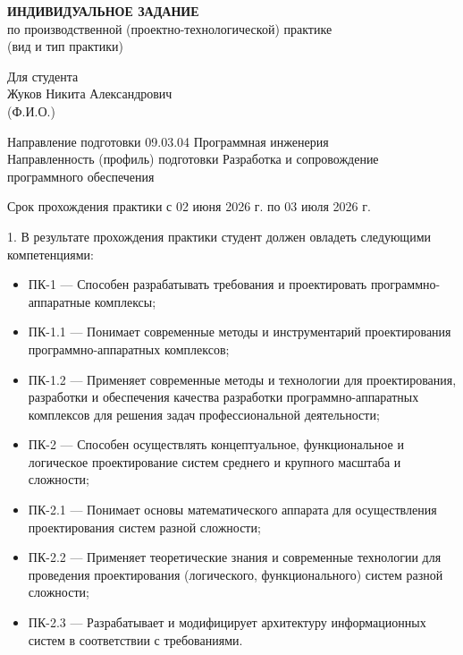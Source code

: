 \documentclass[12pt,a4paper]{report}
\begin{document}
\newpage
\thispagestyle{empty}

\begin{center}
\textbf{ИНДИВИДУАЛЬНОЕ ЗАДАНИЕ} \\
по производственной (проектно-технологической) практике \\
(вид и тип практики)
\end{center}

\vspace{1em}

Для студента \hrulefill \\
Жуков Никита Александрович \hrulefill \\
(Ф.И.О.)

Направление подготовки 09.03.04 Программная инженерия \\
Направленность (профиль) подготовки Разработка и сопровождение программного обеспечения

Срок прохождения практики с 02 июня 2026 г. по 03 июля 2026 г.

\vspace{1em}

1. В результате прохождения практики студент должен овладеть следующими компетенциями:
\begin{itemize}
    \item ПК-1 --- Способен разрабатывать требования и проектировать программно-аппаратные комплексы;
    \item ПК-1.1 --- Понимает современные методы и инструментарий проектирования программно-аппаратных комплексов;
    \item ПК-1.2 --- Применяет современные методы и технологии для проектирования, разработки и обеспечения качества разработки программно-аппаратных комплексов для решения задач профессиональной деятельности;
    \item ПК-2 --- Способен осуществлять концептуальное, функциональное и логическое проектирование систем среднего и крупного масштаба и сложности;
    \item ПК-2.1 --- Понимает основы математического аппарата для осуществления проектирования систем разной сложности;
    \item ПК-2.2 --- Применяет теоретические знания и современные технологии для проведения проектирования (логического, функционального) систем разной сложности;
    \item ПК-2.3 --- Разрабатывает и модифицирует архитектуру информационных систем в соответствии с требованиями.
\end{itemize}
\end{document}
